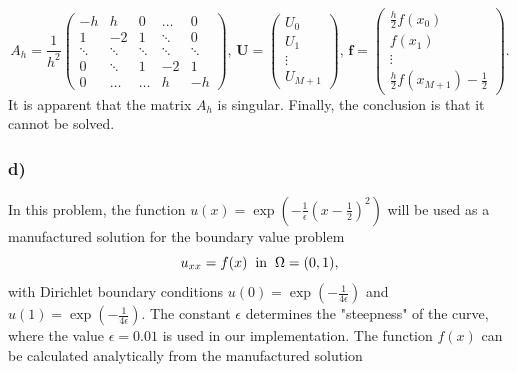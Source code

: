 \begin{equation*}
    A_h = \frac{1}{h^2}\begin{pmatrix} 
    -h & h & 0 & \dots & 0 \\
    1 & -2 & 1 & \ddots & 0 \\
    \ddots & \ddots & \ddots & \ddots & \ddots \\
    0 & \ddots & 1 & -2 & 1 \\
    0 & \dots & \dots & h & -h
    \end{pmatrix}, \, 
    \boldsymbol{U} = \begin{pmatrix}
    U_0 \\
    U_1 \\
    \vdots \\
    U_{M+1} 
    \end{pmatrix}, \, \boldsymbol{f} = \begin{pmatrix}
    \frac{h}{2}f(x_0) \\
    f(x_1) \\
    \vdots \\
    \frac{h}{2}f(x_{M+1}) - \frac{1}{2}
    \end{pmatrix}.
\end{equation*}
It is apparent that the matrix $A_h$ is singular. Finally, the conclusion is that it cannot be solved.

\subsubsection{d)}

In this problem, the function $u(x) = \exp{\left(-\frac{1}{\epsilon}(x-\frac{1}{2})^2\right)}$ will be used as a manufactured solution for the boundary value problem 
\begin{equation}
    u_{xx} = f(x) \hspace{2mm} \text{in} \hspace{2mm} \Omega = (0,1),
\end{equation}
with Dirichlet boundary conditions $u(0) = \exp{\left(-\frac{1}{4\epsilon}\right)}$ and $u(1) = \exp{\left(-\frac{1}{4\epsilon}\right)}$. The constant $\epsilon$ determines the "steepness" of the curve, where the value $\epsilon = 0.01$ is used in our implementation. The function $f(x)$ can be calculated analytically from the manufactured solution

